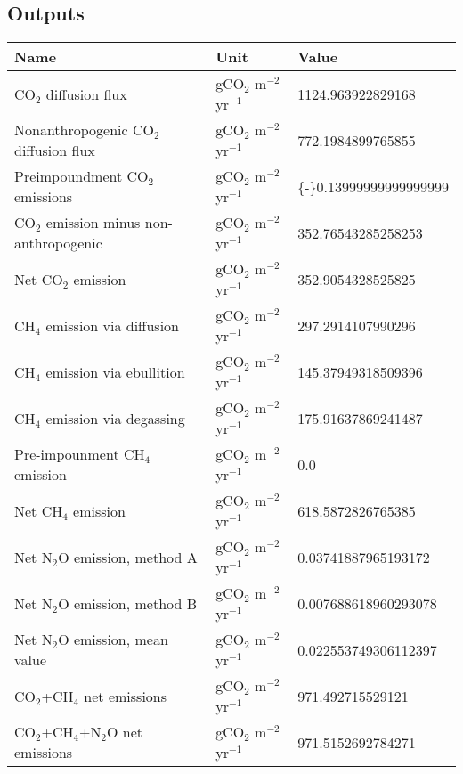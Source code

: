 \documentclass{article}%
\begin{document}
%
\subsection{Outputs}%
\label{subsec:Outputs}%
\begin{center}%
\renewcommand{\arraystretch}{1.0}%
\begin{tabu}{@{}p{10cm} X[c] X[l]@{}}%
\toprule%
\textbf{Name}&\textbf{Unit}&\textbf{Value}\\%
\midrule%
CO$_2$ diffusion flux&gCO$_2$ m$^{-2}$ yr$^{-1}$&\num[round-precision=4,round-mode=figures]{1124.963922829168}\\%
Nonanthropogenic CO$_2$ diffusion flux&gCO$_2$ m$^{-2}$ yr$^{-1}$&\num[round-precision=4,round-mode=figures]{772.1984899765855}\\%
Preimpoundment CO$_2$ emissions&gCO$_2$ m$^{-2}$ yr$^{-1}$&\num[round-precision=4,round-mode=figures]{{-}0.13999999999999999}\\%
CO$_2$ emission minus non-anthropogenic&gCO$_2$ m$^{-2}$ yr$^{-1}$&\num[round-precision=4,round-mode=figures]{352.76543285258253}\\%
Net CO$_2$ emission&gCO$_2$ m$^{-2}$ yr$^{-1}$&\num[round-precision=4,round-mode=figures]{352.9054328525825}\\%
CH$_4$ emission via diffusion&gCO$_2$ m$^{-2}$ yr$^{-1}$&\num[round-precision=4,round-mode=figures]{297.2914107990296}\\%
CH$_4$ emission via ebullition&gCO$_2$ m$^{-2}$ yr$^{-1}$&\num[round-precision=4,round-mode=figures]{145.37949318509396}\\%
CH$_4$ emission via degassing&gCO$_2$ m$^{-2}$ yr$^{-1}$&\num[round-precision=4,round-mode=figures]{175.91637869241487}\\%
Pre-impounment CH$_4$ emission&gCO$_2$ m$^{-2}$ yr$^{-1}$&\num[round-precision=4,round-mode=figures]{0.0}\\%
Net CH$_4$ emission&gCO$_2$ m$^{-2}$ yr$^{-1}$&\num[round-precision=4,round-mode=figures]{618.5872826765385}\\%
Net N$_2$O emission, method A&gCO$_2$ m$^{-2}$ yr$^{-1}$&\num[round-precision=4,round-mode=figures]{0.03741887965193172}\\%
Net N$_2$O emission, method B&gCO$_2$ m$^{-2}$ yr$^{-1}$&\num[round-precision=4,round-mode=figures]{0.007688618960293078}\\%
Net N$_2$O emission, mean value&gCO$_2$ m$^{-2}$ yr$^{-1}$&\num[round-precision=4,round-mode=figures]{0.022553749306112397}\\%
\midrule%
CO$_2$+CH$_4$ net emissions&gCO$_2$ m$^{-2}$ yr$^{-1}$&\num[round-precision=4,round-mode=figures]{971.492715529121}\\%
\midrule%
CO$_2$+CH$_4$+N$_2$O net emissions&gCO$_2$ m$^{-2}$ yr$^{-1}$&\num[round-precision=4,round-mode=figures]{971.5152692784271}\\\bottomrule%
%
\end{tabu}%
\end{center}%
\end{document}
